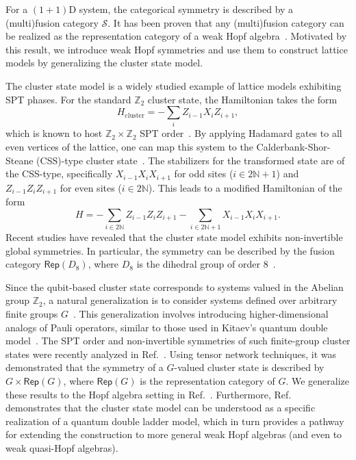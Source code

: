 \documentclass[a4paper,11pt]{article}
\theoremstyle{theorem}
\theoremstyle{remark}
\newcommand{\Rep}{\mathsf{Rep}}
\begin{document}
For a $(1+1)$D system, the categorical symmetry is described by a (multi)fusion category $\mathcal{S}$. It has been proven that any (multi)fusion category can be realized as the representation category of a weak Hopf algebra~\cite{szlachanyi2000finite,ostrik2003module,etingof2005fusion}. Motivated by this result, we introduce weak Hopf symmetries and use them to construct lattice models by generalizing the cluster state model.


The cluster state model is a widely studied example of lattice models exhibiting SPT phases. For the standard $\mathbb{Z}_2$ cluster state, the Hamiltonian takes the form  
\begin{equation}\label{eq:ClusterHamiltonianNormal}
    H_{\mathrm{cluster}} = -\sum_i Z_{i-1} X_i Z_{i+1},
\end{equation}
which is known to host $\mathbb{Z}_2 \times \mathbb{Z}_2$ SPT order~\cite{son2012topological}.
By applying Hadamard gates to all even vertices of the lattice, one can map this system to the Calderbank-Shor-Steane (CSS)-type cluster state~\cite{brell2015generalized,fechisin2023noninvertible,jia2024generalized}. The stabilizers for the transformed state are of the CSS-type, specifically $X_{i-1} X_i X_{i+1}$ for odd sites ($i \in 2\mathbb{N}+1$) and $Z_{i-1} Z_i Z_{i+1}$ for even sites ($i \in 2\mathbb{N}$). This leads to a modified Hamiltonian of the form
\begin{equation}\label{eq:ClusterHamiltonianCSS}
    H = -\sum_{i \in 2\mathbb{N}} Z_{i-1} Z_i Z_{i+1} - \sum_{i \in 2\mathbb{N}+1} X_{i-1} X_i X_{i+1}.
\end{equation}
Recent studies have revealed that the cluster state model exhibits non-invertible global symmetries. In particular, the symmetry can be described by the fusion category $\Rep(D_8)$, where $D_8$ is the dihedral group of order 8~\cite{Seifnashri2024cluster}.  

Since the qubit-based cluster state corresponds to systems valued in the Abelian group $\mathbb{Z}_2$, a natural generalization is to consider systems defined over arbitrary finite groups $G$~\cite{brell2015generalized}. This generalization involves introducing higher-dimensional analogs of Pauli operators, similar to those used in Kitaev's quantum double model~\cite{Kitaev2003,albert2021spin}.  
The SPT order and non-invertible symmetries of such finite-group cluster states were recently analyzed in Ref.~\cite{fechisin2023noninvertible}. Using tensor network techniques, it was demonstrated that the symmetry of a $G$-valued cluster state is described by $G \times \Rep(G)$, where $\Rep(G)$ is the representation category of $G$.  
We generalize these results to the Hopf algebra setting in Ref.~\cite{jia2024generalized}. 
Furthermore, Ref.~\cite{jia2024generalized} demonstrates that the cluster state model can be understood as a specific realization of a quantum double ladder model, which in turn provides a pathway for extending the construction to more general weak Hopf algebras (and even to weak quasi-Hopf algebras).
\end{document}
